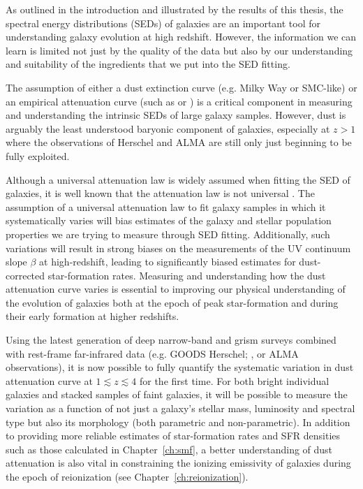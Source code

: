 As outlined in the introduction and illustrated by the results of this thesis, the spectral energy distributions (SEDs) of galaxies are an important tool for understanding galaxy evolution at high redshift. However, the information we can learn is limited not just by the quality of the data but also by our understanding and suitability of the ingredients that we put into the SED fitting.

The assumption of either a dust extinction curve (e.g. Milky Way or SMC-like) or an empirical attenuation curve (such as \citet{2000ApJ...533..682C} or \citet{2000ApJ...539..718C}) is a critical component in measuring and understanding the intrinsic SEDs of large galaxy samples. However, dust is arguably the least understood baryonic component of galaxies, especially at $z > 1$ where the observations of Herschel and ALMA are still only just beginning to be fully exploited. 

Although a universal attenuation law is widely assumed when fitting the SED of galaxies, it is well known that the attenuation law is not universal \citep{Buat:2012ku,Kriek:2013kx}. The assumption of a universal attenuation law to fit galaxy samples in which it systematically varies will bias estimates of the galaxy and stellar population properties we are trying to measure through SED fitting. Additionally, such variations will result in strong biases on the measurements of the UV continuum slope $\beta$ at high-redshift, leading to significantly biased estimates for dust-corrected star-formation rates. Measuring and understanding how the dust attenuation curve varies is essential to improving our physical understanding of the evolution of galaxies both at the epoch of peak star-formation and during their early formation at higher redshifts.

Using the latest generation of deep narrow-band \citep{PerezGonzalez:2012fo} and grism surveys \citep{Brammer:2012bu} combined with rest-frame far-infrared data (e.g. GOODS Herschel; \citet{Elbaz:2011ix}, or ALMA observations), it is now possible to fully quantify the systematic variation in dust attenuation curve at $1 \lesssim z \lesssim 4$ for the first time. For both bright individual galaxies and stacked samples of faint galaxies, it will be possible to measure the variation as a function of not just a galaxy’s stellar mass, luminosity and spectral type but also its morphology (both parametric and non-parametric). In addition to providing more reliable estimates of star-formation rates and SFR densities such as those calculated in Chapter~\ref{ch:smf}, a better understanding of dust attenuation is also vital in constraining the ionizing emissivity of galaxies during the epoch of reionization (see Chapter~\ref{ch:reionization}).

